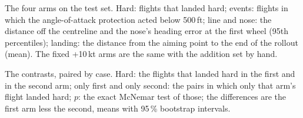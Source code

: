 \documentclass[10pt,a4paper,twocolumn]{article}
\begin{document}
\begin{table}[t]\centering\footnotesize

\caption{The four arms on the test set. Hard: flights that landed hard; events: flights in which the angle-of-attack protection acted below 500\,ft; line and nose: the distance off the centreline and the
nose's heading error at the first wheel (95th percentiles); landing: the distance from the aiming point to the end of the rollout (mean). The fixed +10\,kt arms are the same with the addition set by hand.}\label{tab:gust4}
\end{table}
\begin{table}[t]\centering\footnotesize

\caption{The contrasts, paired by case. Hard: the flights that landed hard in the first and in the second arm; only first and only second: the pairs in which only that arm's flight landed hard; $p$: the exact
McNemar test of those; the differences are the first arm less the second, means with 95\,\% bootstrap intervals.}\label{tab:gustc}
\end{table}
\end{document}
